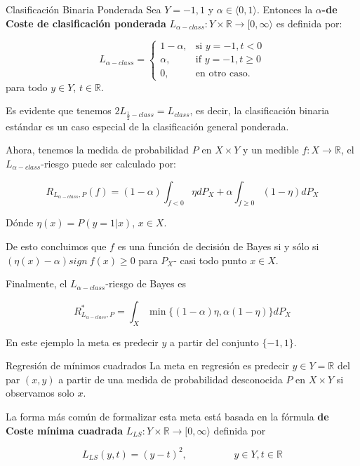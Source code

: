 \documentclass[utf8,spanish,xcolor={table,dvipsnames},12pt]{beamer}
\begin{document}
\begin{frame}{Clasificación Binaria Ponderada}
Sea $Y={-1,1}$ y $\alpha \in \langle 0,1 \rangle$. Entonces la \textbf{$\alpha$-de Coste de clasificación ponderada} $L_{\alpha -class}:Y\times\mathds{R}\rightarrow[0,\infty \rangle$ es definida por:

$$L_{\alpha -class}=\begin{cases}
                             1-\alpha, & \mbox{si } y=-1, t<0 \\
                             \alpha, & \mbox{if } y=-1,t\geq0 \\
                             0, & \mbox{en otro caso}.
                           \end{cases}$$
para todo $y\in Y$, $t\in\mathds{R}$.
\end{frame}


\begin{frame}
Es evidente que tenemos $2L_{\frac{1}{2}-class}=L_{class}$, es decir, la clasificación binaria estándar es un caso especial de la clasificación general ponderada. 

\vspace{0.2cm}

Ahora, tenemos la medida de probabilidad $P$ en $X\times Y$ y un medible $f:X\rightarrow\mathds{R}$, el $L_{\alpha-class}$-riesgo puede ser calculado por:

$$R_{L_{\alpha-class},P}(f)=(1-\alpha)\int_{f<0}\eta dP_{X}+\alpha\int_{f\geq0}(1-\eta)dP_{X}$$

Dónde $\eta(x)=P(y=1|x)$, $x\in X$.
\end{frame}


\begin{frame}
 De esto concluimos que $f$ es una función de decisión de Bayes si y sólo si $(\eta(x)-\alpha) sign\  f(x)\geq0$ para $P_{X}$- casi todo punto $x\in X$.
 
\vspace{0.2cm}


Finalmente, el $L_{\alpha-class}$-riesgo de Bayes es

$$R^{\ast}_{L_{\alpha-class},P}=\int_{X}\min \{(1-\alpha)\eta,\alpha(1-\eta)\}dP_{X}$$

En este ejemplo la meta es predecir $y$ a partir del conjunto $\{-1,1\}$.
\end{frame}


\begin{frame}{Regresión de mínimos cuadrados}
La meta en regresión es predecir $y\in Y=\mathds{R}$ del par $(x,y)$ a partir de una medida de probabilidad desconocida $P$ en $X\times Y$ si observamos solo $x$. 

\vspace{0.2cm}

 La forma más común de formalizar esta meta está basada en la f\'ormula  \textbf{de Coste mínima cuadrada} $L_{LS}:Y\times \mathds{R}\rightarrow[0,\infty\rangle$ definida por

$$L_{LS}(y,t)=(y-t)^{2}, \hspace{2cm} y\in Y, t\in \mathds{R}$$
\end{frame}
\end{document}
